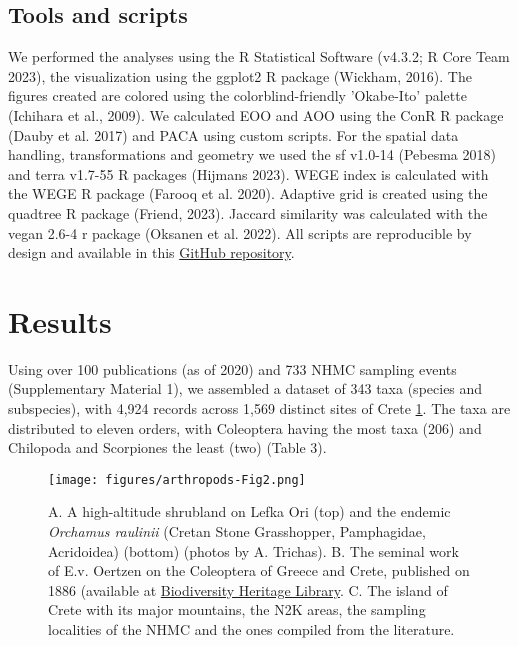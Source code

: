     \subsection{Tools and scripts}
    \label{subsec:arthropods-tools}
We performed the analyses using the R Statistical Software (v4.3.2; R Core Team 2023),
the visualization using the ggplot2 R package (Wickham, 2016). The figures
created are colored using the colorblind-friendly 'Okabe-Ito' palette (Ichihara et al., 2009).
We calculated EOO and AOO using the ConR R package (Dauby et al. 2017) and PACA
using custom scripts. For the spatial data handling, transformations and
geometry we used the sf v1.0-14 (Pebesma 2018) and terra v1.7-55 R packages (Hijmans 2023).
WEGE index is calculated with the WEGE R package (Farooq et al. 2020).
Adaptive grid is created using the quadtree R package (Friend, 2023).
Jaccard similarity was calculated with the vegan 2.6-4 r package (Oksanen et al. 2022).
All scripts are reproducible by design and available in this 
\href{https://github.com/savvas-paragkamian/arthropoda_assessment_crete}{GitHub repository}.

\section{Results}
\label{sec:arthropods-results}

Using over 100 publications (as of 2020) and 733 NHMC sampling events
(Supplementary Material 1), we assembled a dataset of 343 taxa (species and subspecies),
with 4,924 records across 1,569 distinct sites of Crete \ref{fig:arthropods-fig2}. The taxa
are distributed to eleven orders, with Coleoptera having the most taxa (206)
and Chilopoda and Scorpiones the least (two) (Table 3).

   \begin{figure}[h]
      \centering
      \texttt{[image: figures/arthropods-Fig2.png]}
      \caption[The common endemicity hotspots of all orders]{A. A high-altitude shrubland on Lefka Ori (top) and the endemic \textit{Orchamus raulinii} (Cretan Stone Grasshopper, Pamphagidae, Acridoidea) (bottom) (photos by A. Trichas). B. The seminal work of E.v. Oertzen on the Coleoptera of Greece and Crete, published on 1886 (available at \href{https://www.biodiversitylibrary.org/page/32058852}{Biodiversity Heritage Library}. C. The island of Crete with its major mountains, the N2K areas, the sampling localities of the NHMC and the ones compiled from the literature.}
      \label{fig:arthropods-fig2}
   \end{figure}


